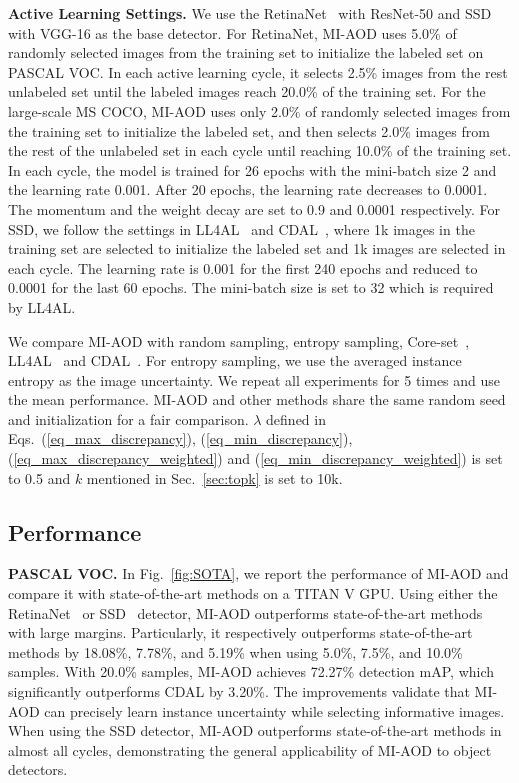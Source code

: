 \documentclass[final]{cvpr}
\begin{document}
\textbf{Active Learning Settings.} We use the RetinaNet~\cite{RetinaNet20} with ResNet-50 and SSD~\cite{SSD16} with VGG-16 as the base detector. 
For RetinaNet, MI-AOD uses 5.0\% of randomly selected images from the training set to initialize the labeled set on PASCAL VOC. In each active learning cycle, it selects 2.5\% images from the rest unlabeled set until the labeled images reach 20.0\% of the training set. 
For the large-scale MS COCO, MI-AOD uses only 2.0\% of randomly selected images from the training set to initialize the labeled set, and then selects 2.0\% images from the rest of the unlabeled set in each cycle until reaching 10.0\% of the training set. 
In each cycle, the model is trained for 26 epochs with the mini-batch size 2 and the learning rate 0.001. After 20 epochs, the learning rate decreases to 0.0001. The momentum and the weight decay are set to 0.9 and 0.0001 respectively.
For SSD, we follow the settings in LL4AL~\cite{LearningLoss19} and CDAL~\cite{CDAL20}, where 1k images in the training set are selected to initialize the labeled set and 1k images are selected in each cycle. The learning rate is 0.001 for the first 240 epochs and reduced to 0.0001 for the last 60 epochs. The mini-batch size is set to 32 which is required by LL4AL.


We compare MI-AOD with random sampling, entropy sampling, Core-set~\cite{CoreSet18}, LL4AL~\cite{LearningLoss19} and CDAL~\cite{CDAL20}. For entropy sampling, we use the averaged instance entropy as the image uncertainty. We repeat all experiments for 5 times and use the mean performance. MI-AOD and other methods share the same random seed and initialization for a fair comparison. $\lambda$ defined in Eqs.~(\ref{eq_max_discrepancy}), (\ref{eq_min_discrepancy}), (\ref{eq_max_discrepancy_weighted}) and (\ref{eq_min_discrepancy_weighted}) is set to 0.5 and $k$ mentioned in Sec.~\ref{sec:topk} is set to 10k.


\subsection{Performance}
\textbf{PASCAL VOC.} In Fig.~\ref{fig:SOTA}, we report the performance of MI-AOD and compare it with state-of-the-art methods on a TITAN V GPU. Using either the RetinaNet~\cite{RetinaNet20} or SSD~\cite{SSD2016} detector, MI-AOD outperforms state-of-the-art methods with large margins. Particularly, it respectively outperforms state-of-the-art methods by 18.08\%, 7.78\%, and 5.19\% when using 5.0\%, 7.5\%, and 10.0\% samples. With 20.0\% samples, MI-AOD achieves 72.27\% detection mAP, which significantly outperforms CDAL by 3.20\%. The improvements validate that MI-AOD can precisely learn instance uncertainty while selecting informative images. When using the SSD detector, MI-AOD outperforms state-of-the-art methods in almost all cycles, demonstrating the general applicability of MI-AOD to object detectors. 
\end{document}
